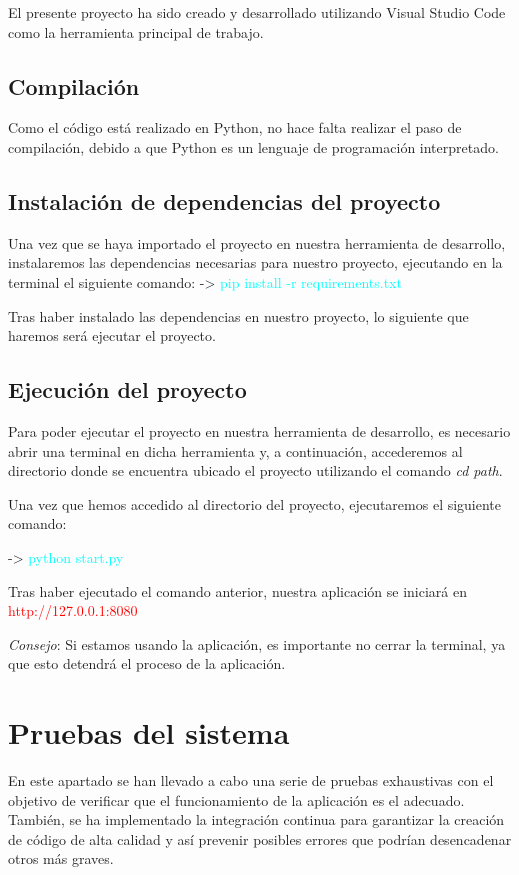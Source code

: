 El presente proyecto ha sido creado y desarrollado utilizando Visual Studio Code como la herramienta principal de trabajo. 

\subsection{Compilación}
Como el código está realizado en Python, no hace falta realizar el paso de compilación, debido a que Python es un lenguaje de programación interpretado.

\subsection{Instalación de dependencias del proyecto }
Una vez que se haya importado el proyecto en nuestra herramienta de desarrollo, instalaremos las dependencias necesarias para nuestro proyecto, ejecutando en la terminal el siguiente comando:  
   -> \textcolor{cyan}{ pip install -r requirements.txt}

 Tras haber instalado las dependencias en nuestro proyecto, lo siguiente que haremos será ejecutar el proyecto.

\subsection{Ejecución del proyecto}

Para poder ejecutar el proyecto en nuestra herramienta de desarrollo, es necesario abrir una terminal en dicha herramienta y, a continuación, accederemos al directorio donde se encuentra ubicado el proyecto utilizando el comando \textit{cd {path}}.

Una vez que hemos accedido al directorio del proyecto, ejecutaremos el siguiente comando:

   -> \textcolor{ cyan}{python  start.py}

Tras haber ejecutado el comando anterior, nuestra aplicación  se iniciará en \textcolor{red}{http://127.0.0.1:8080}

\textit{Consejo}: Si estamos usando la aplicación, es importante no cerrar la terminal, ya que esto detendrá el proceso de la aplicación.


\section{Pruebas del sistema}

En este apartado se han llevado a cabo una serie de pruebas exhaustivas con el objetivo de verificar que el funcionamiento de la aplicación es el adecuado. También, se ha implementado la integración continua para garantizar la creación de código de alta calidad y así prevenir posibles errores que podrían desencadenar otros más graves.

